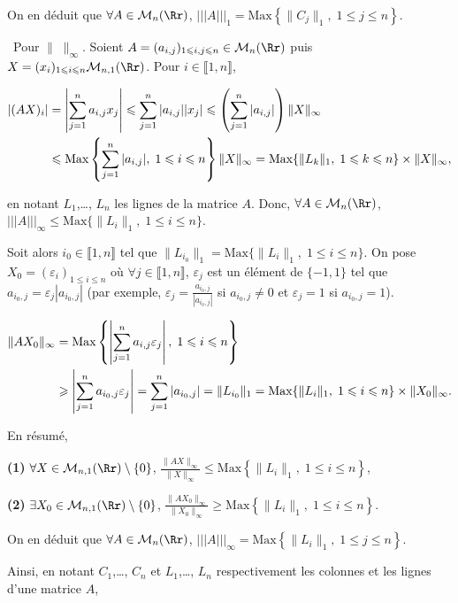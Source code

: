 {{On en déduit que $\forall A\in\mathcal{M}_n(\Rr)$, $|||A|||_1=\text{Max}\left\{\|C_j\|_1,\;1\leqslant j\leqslant n\right\}$.

\textbullet~Pour $\|\;\|_\infty$. Soient $A=(a_{i,j})_{1\leqslant i,j\leqslant n}\in\mathcal{M}_n(\Rr)$ puis $X=(x_i)_{1\leqslant i\leqslant n}\mathcal{M}_{n,1}(\Rr)$. Pour $i\in\llbracket1,n\rrbracket$,

\begin{align*}\ensuremath
|(AX)_i|&=\left|\sum_{j=1}^{n}a_{i,j}x_j\right|\leqslant\sum_{j=1}^{n}|a_{i,j}||x_j|\leqslant\left(\sum_{j=1}^{n}|a_{i,j}|\right)\|X\|_\infty\\
 &\leqslant\text{Max}\left\{\sum_{j=1}^{n}|a_{i,j}|,\;1\leqslant i\leqslant n\right\}\|X\|_\infty=\text{Max}\{\|L_k\|_1,\;1\leqslant k\leqslant n\}\times\|X\|_\infty,
\end{align*}

en notant $L_1$,\ldots, $L_n$ les lignes de la matrice $A$. Donc, $\forall A\in\mathcal{M}_n(\Rr)$, $|||A|||_\infty\leqslant\text{Max}\{\|L_i\|_1,\;1\leqslant i\leqslant n\}$.

Soit alors $i_0\in\llbracket1,n\rrbracket$ tel que $\|L_{i_0}\|_1=\text{Max}\{\|L_i\|_1,\;1\leqslant i\leqslant n\}$. On pose $X_{0}=\left(\varepsilon_i\right)_{1\leqslant i\leqslant n}$ où $\forall j\in\llbracket 1,n\rrbracket$, $\varepsilon_j$ est un élément de $\{-1,1\}$ tel que $a_{i_0,j}=\varepsilon_j|a_{i_0,j}|$ (par exemple, $\varepsilon_j= \frac{a_{i_0,j}}{|a_{i_0,j}|}$ si $a_{i_0,j}\neq0$ et $\varepsilon_j=1$ si $a_{i_0,j}=1$).

\begin{align*}\ensuremath
\|AX_0\|_\infty&=\text{Max}\left\{\left|\sum_{j=1}^{n}a_{i,j}\varepsilon_j\right|,\;1\leqslant i\leqslant n\right\}\\
 &\geqslant\left|\sum_{j=1}^{n}a_{i_0,j}\varepsilon_j\right|=\sum_{j=1}^{n}|a_{i_0,j}|=\|L_{i_0}\|_1
=\text{Max}\{\|L_i\|_1,\;1\leqslant i\leqslant n\}\times\|X_0\|_\infty.
\end{align*}

En résumé,

\textbf{(1)} $\forall X\in\mathcal{M}_{n,1}(\Rr)\setminus\{0\}$, $ \frac{\|AX\|_\infty}{\|X\|_\infty}\leqslant\text{Max}\left\{\|L_i\|_1,\;1\leqslant i\leqslant n\right\}$,

\textbf{(2)} $\exists X_0\in\mathcal{M}_{n,1}(\Rr)\setminus\{0\}$, $ \frac{\|AX_0\|_\infty}{\|X_0\|_\infty}\geqslant\text{Max}\left\{\|L_i\|_1,\;1\leqslant i\leqslant n\right\}$.

On en déduit que $\forall A\in\mathcal{M}_n(\Rr)$, $|||A|||_\infty=\text{Max}\left\{\|L_i\|_1,\;1\leqslant j\leqslant n\right\}$.

Ainsi, en notant $C_1$,\ldots, $C_n$ et $L_1$,\ldots, $L_n$ respectivement les colonnes et les lignes d'une matrice $A$,

\begin{center}
\end{center}
}
}
